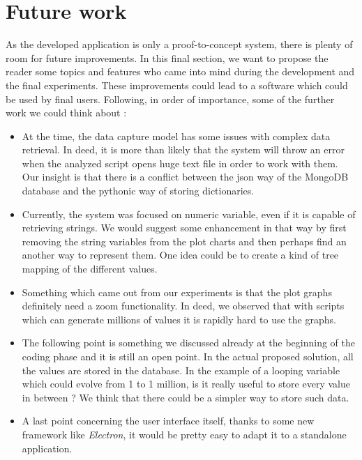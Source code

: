 \section{Future work}
As the developed application is only a proof-to-concept system, there is plenty of room for future improvements. In this final section, we want to propose the reader some topics and features who came into mind during the development and the final experiments. These improvements could lead to a software which could be used by final users. Following, in order of importance, some of the further work we could think about :
\begin{itemize}
  \item At the time, the data capture model has some issues with complex data retrieval. In deed, it is more than likely that the system will throw an error when the analyzed script opens huge text file in order to work with them. Our insight is that there is a conflict between the json way of the MongoDB database and the pythonic way of storing dictionaries.
  \item Currently, the system was focused on numeric variable, even if it is capable of retrieving strings. We would suggest some enhancement in that way by first removing the string variables from the plot charts and then perhaps find an another way to represent them. One idea could be to create a kind of tree mapping of the different values.
  \item Something which came out from our experiments is that the plot graphs definitely need a zoom functionality. In deed, we observed that with scripts which can generate millions of values it is rapidly hard to use the graphs. 
  \item The following point is something we discussed already at the beginning of the coding phase and it is still an open point. In the actual proposed solution, all the values are stored in the database. In the example of a looping variable which could evolve from 1 to 1 million, is it really useful to store every value in between ? We think that there could be a simpler way to store such data.
  \item A last point concerning the user interface itself, thanks to some new framework like \textit{Electron}, it would be pretty easy to adapt it to a standalone application.
\end{itemize}
  
